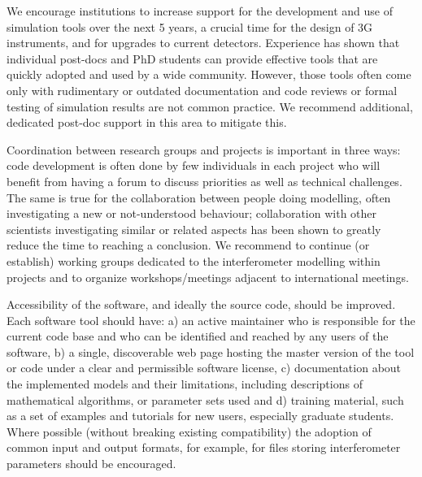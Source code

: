 We encourage institutions to increase support for the development and use of simulation tools over the next 5 years, a crucial time for the design of 3G instruments, and for upgrades to current detectors.
Experience has shown that
individual post-docs and PhD students can provide effective tools that are quickly adopted and used by a wide community. However, those tools often come only with rudimentary or outdated documentation and code reviews or formal testing of simulation results are not common practice. We recommend additional, dedicated post-doc support in this area to mitigate this.

Coordination between research groups and projects is important in three ways:
code development is often done by few individuals in each project who will benefit from having a forum to discuss priorities as well as technical challenges. The same is true for the collaboration between people
doing modelling, often 
investigating a new or not-understood behaviour;
collaboration with other scientists investigating similar or related aspects has been shown to greatly reduce the time to reaching a conclusion. We recommend to continue (or establish) working groups dedicated to the interferometer modelling within projects and 
to organize workshops/meetings adjacent to international meetings.

Accessibility of the software, and ideally the source code, should be improved. Each software tool should have: a) an active maintainer who is responsible for the current code base and who can be identified and reached by any users of the software, b) a single, discoverable web page hosting the master version of the tool or code under a clear and permissible software license, c) documentation about the implemented models and their limitations, including descriptions of mathematical algorithms, or parameter sets used and d) training material, such as a set of examples and tutorials for new users, especially graduate students. Where possible (without breaking existing compatibility) the adoption of common  input and output formats, for example, for files storing interferometer parameters  should be encouraged.

